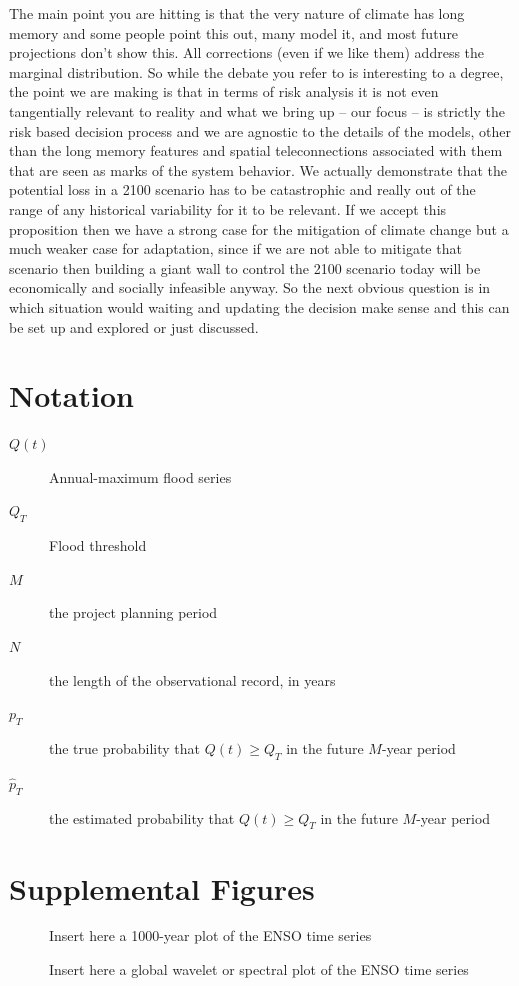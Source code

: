 \documentclass[12pt]{article}
\begin{document}
The main point you are hitting is that the very nature of climate has long memory and some people point this out, many model it, and most future projections don't show this.
All corrections (even if we like them) address the marginal distribution.
So while the debate you refer to is interesting to a degree, the point we are making is that in terms of risk analysis it is not even tangentially relevant to reality and what we bring up -- our focus -- is strictly the risk based decision process and we are agnostic to the details of the models, other than the long memory features and spatial teleconnections associated with them that are seen as marks of the system behavior.
We actually demonstrate that the potential loss in a 2100 scenario has to be catastrophic and really out of the range of any historical variability for it to be relevant.
If we accept this proposition then we have a strong case for the mitigation of climate change but a much weaker case for adaptation, since if we are not able to mitigate that scenario then building a giant wall to control the 2100 scenario today will be economically and socially infeasible anyway.
So the next obvious question is in which situation would waiting and updating the decision make sense and this can be set up and explored or just discussed.


\appendix
\printbibliography{}

\section{Notation}

\begin{description}
  \item[\( Q(t) \)] Annual-maximum flood series
  \item[\( Q_T \)] Flood threshold
  \item[\( M \)] the project planning period
  \item[\( N \)] the length of the observational record, in years
  \item[\( p_T \)] the true probability that \( Q(t) \geq Q_T \) in the future \(M\)-year period
  \item[\( \hat{p}_T \)] the estimated probability that \( Q(t) \geq Q_T \) in the future \(M\)-year period
\end{description}

\section{Supplemental Figures}

\begin{figure}
  \caption{Insert here a 1000-year plot of the ENSO time series\label{fig:enso-ts}}
\end{figure}

\begin{figure}
  \caption{Insert here a global wavelet or spectral plot of the ENSO time series\label{fig:enso-spectrum}}
\end{figure}
\end{document}
